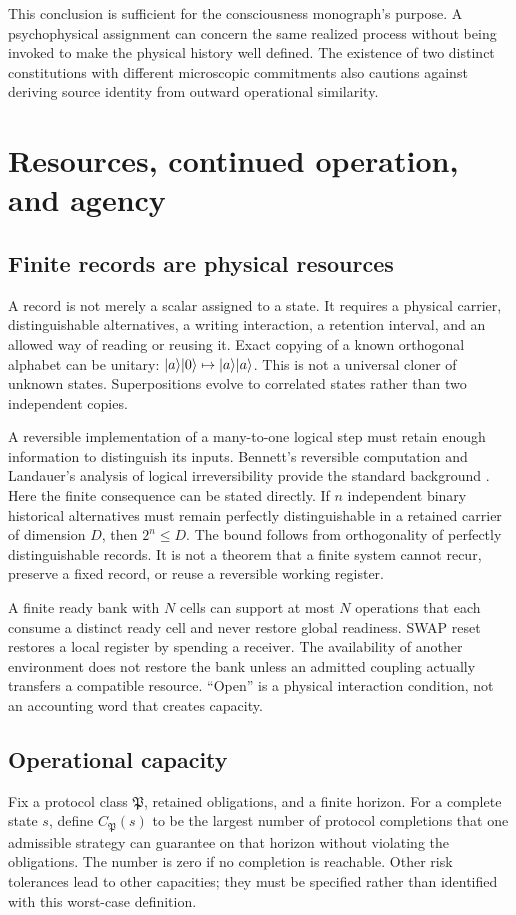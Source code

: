 This conclusion is sufficient for the consciousness monograph's purpose. A psychophysical assignment can concern the same realized process without being invoked to make the physical history well defined. The existence of two distinct constitutions with different microscopic commitments also cautions against deriving source identity from outward operational similarity.

\chapter{Resources, continued operation, and agency}\label{ch:resources}
\section{Finite records are physical resources}\label{section:resources:finite-records-are-physical-resources}
A record is not merely a scalar assigned to a state. It requires a physical carrier, distinguishable alternatives, a writing interaction, a retention interval, and an allowed way of reading or reusing it. Exact copying of a known orthogonal alphabet can be unitary: $\lvert a\rangle\lvert 0\rangle\mapsto\lvert a\rangle\lvert a\rangle$. This is not a universal cloner of unknown states. Superpositions evolve to correlated states rather than two independent copies.

A reversible implementation of a many-to-one logical step must retain enough information to distinguish its inputs. Bennett's reversible computation and Landauer's analysis of logical irreversibility provide the standard background \cite{Bennett1973,Landauer1961}. Here the finite consequence can be stated directly. If $n$ independent binary historical alternatives must remain perfectly distinguishable in a retained carrier of dimension $D$, then $2^n\le D$. The bound follows from orthogonality of perfectly distinguishable records. It is not a theorem that a finite system cannot recur, preserve a fixed record, or reuse a reversible working register.

A finite ready bank with $N$ cells can support at most $N$ operations that each consume a distinct ready cell and never restore global readiness. SWAP reset restores a local register by spending a receiver. The availability of another environment does not restore the bank unless an admitted coupling actually transfers a compatible resource. ``Open'' is a physical interaction condition, not an accounting word that creates capacity.

\section{Operational capacity}\label{section:resources:operational-capacity}
Fix a protocol class $\mathfrak P$, retained obligations, and a finite horizon. For a complete state $s$, define $C_{\mathfrak P}(s)$ to be the largest number of protocol completions that one admissible strategy can guarantee on that horizon without violating the obligations. The number is zero if no completion is reachable. Other risk tolerances lead to other capacities; they must be specified rather than identified with this worst-case definition.

